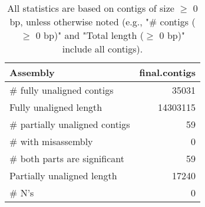 \documentclass[12pt,a4paper]{article}
\begin{document}
\begin{table}[ht]
\begin{center}
\caption{All statistics are based on contigs of size $\geq$ 0 bp, unless otherwise noted (e.g., "\# contigs ($\geq$ 0 bp)" and "Total length ($\geq$ 0 bp)" include all contigs).}
\begin{tabular}{|l*{1}{|r}|}
\hline
Assembly & final.contigs \\ \hline
\# fully unaligned contigs & 35031 \\ \hline
Fully unaligned length & 14303115 \\ \hline
\# partially unaligned contigs & 59 \\ \hline
\hspace{5mm}\# with misassembly & 0 \\ \hline
\hspace{5mm}\# both parts are significant & 59 \\ \hline
Partially unaligned length & 17240 \\ \hline
\# N's & 0 \\ \hline
\end{tabular}
\end{center}
\end{table}
\end{document}
